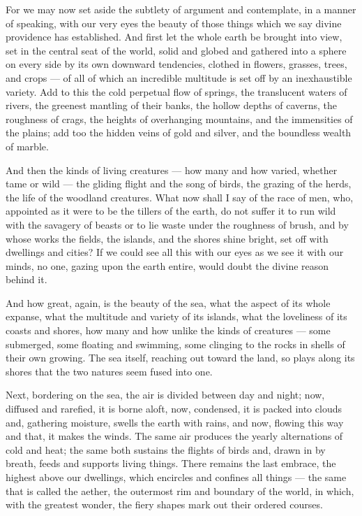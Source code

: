  For we may now set aside the subtlety of argument and contemplate, in a manner of speaking, with our very eyes the beauty of those things which we say divine providence has established. And first let the whole earth be brought into view, set in the central seat of the world, solid and globed and gathered into a sphere on every side by its own downward tendencies, clothed in flowers, grasses, trees, and crops — of all of which an incredible multitude is set off by an inexhaustible variety. Add to this the cold perpetual flow of springs, the translucent waters of rivers, the greenest mantling of their banks, the hollow depths of caverns, the roughness of crags, the heights of overhanging mountains, and the immensities of the plains; add too the hidden veins of gold and silver, and the boundless wealth of marble.

 And then the kinds of living creatures — how many and how varied, whether tame or wild — the gliding flight and the song of birds, the grazing of the herds, the life of the woodland creatures. What now shall I say of the race of men, who, appointed as it were to be the tillers of the earth, do not suffer it to run wild with the savagery of beasts or to lie waste under the roughness of brush, and by whose works the fields, the islands, and the shores shine bright, set off with dwellings and cities? If we could see all this with our eyes as we see it with our minds, no one, gazing upon the earth entire, would doubt the divine reason behind it.

 And how great, again, is the beauty of the sea, what the aspect of its whole expanse, what the multitude and variety of its islands, what the loveliness of its coasts and shores, how many and how unlike the kinds of creatures — some submerged, some floating and swimming, some clinging to the rocks in shells of their own growing. The sea itself, reaching out toward the land, so plays along its shores that the two natures seem fused into one.

 Next, bordering on the sea, the air is divided between day and night; now, diffused and rarefied, it is borne aloft, now, condensed, it is packed into clouds and, gathering moisture, swells the earth with rains, and now, flowing this way and that, it makes the winds. The same air produces the yearly alternations of cold and heat; the same both sustains the flights of birds and, drawn in by breath, feeds and supports living things. There remains the last embrace, the highest above our dwellings, which encircles and confines all things — the same that is called the aether, the outermost rim and boundary of the world, in which, with the greatest wonder, the fiery shapes mark out their ordered courses.

